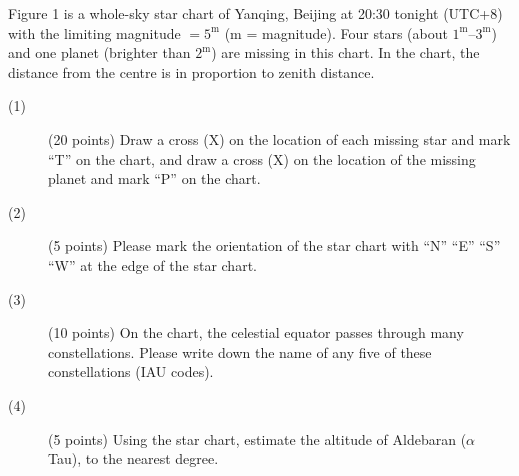 Figure 1 is a whole-sky star chart of Yanqing, Beijing at 20:30 tonight
(UTC+8) with the limiting magnitude $= 5^{\mathrm{m}}$ ($\mathrm{m}$ =
magnitude). Four stars (about $1^{\mathrm{m}}$--$3^{\mathrm{m}}$) and one
planet (brighter than $2^{\mathrm{m}}$) are missing in this chart. In the
chart, the distance from the centre is in proportion to zenith distance.


\begin{description}
\item[(1)] (20 points) Draw a cross (X) on the location of each missing star
  and mark ``T'' on the chart, and draw a cross (X) on the location of the
  missing planet and mark ``P'' on the chart.
\item[(2)] (5 points) Please mark the orientation of the star chart with ``N''
  ``E'' ``S'' ``W'' at the edge of the star chart.
\item[(3)] (10 points) On the chart, the celestial equator passes through many
  constellations. Please write down the name of any five of these
  constellations (IAU codes).
\item[(4)] (5 points) Using the star chart, estimate the altitude of Aldebaran
  ($\alpha$ Tau), to the nearest degree.
\end{description}
